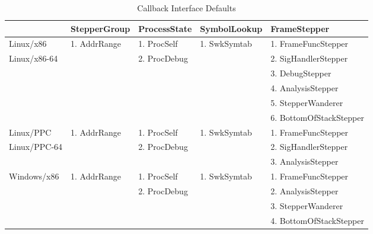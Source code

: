 \begin{table}
\begin{tabular}{| l | l | l | l | l |}
    \hline
                    &   StepperGroup    & ProcessState      &   SymbolLookup    &   FrameStepper\\
    \hline
    Linux/x86       &   1. AddrRange    &   1. ProcSelf     &   1. SwkSymtab    &   1. FrameFuncStepper\\
    Linux/x86-64    &                   &   2. ProcDebug    &                   &   2. SigHandlerStepper\\
                    &                   &                   &                   &   3. DebugStepper\\
                    &                   &                   &                   &   4. AnalysisStepper\\
                    &                   &                   &                   &   5. StepperWanderer\\
                    &                   &                   &                   &   6. BottomOfStackStepper\\
   \hline
    Linux/PPC       &   1. AddrRange    &   1. ProcSelf     &   1. SwkSymtab    & 1. FrameFuncStepper\\
    Linux/PPC-64    &                   &   2. ProcDebug    &                   & 2. SigHandlerStepper\\
                    &                   &                   &                   & 3. AnalysisStepper\\
    \hline
    Windows/x86     &   1. AddrRange    &   1. ProcSelf     &   1. SwkSymtab    & 1. FrameFuncStepper\\
                    &                   &   2. ProcDebug    &                   & 2. AnalysisStepper \\
                    &                   &                   &                   & 3. StepperWanderer\\
                    &                   &                   &                   & 4. BottomOfStackStepper\\
    \hline
\end{tabular}
\caption{Callback Interface Defaults}
\label{table:defaults}
\end{table}






